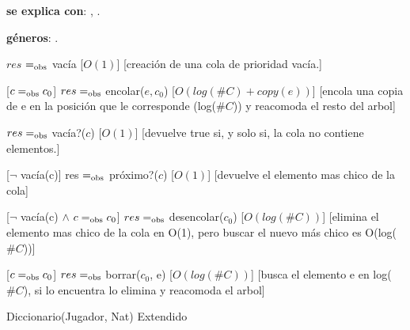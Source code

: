 \begin{Interfaz}

	\textbf{se explica con}: , .

	\textbf{géneros}: .


	{$res$ $=_{\mathrm{obs}}$ vacía}
	[$O(1)$]
	[creación de una cola de prioridad vacía.]

	[$c =_{\mathrm{obs}} c_0$]
	{$res =_{\mathrm{obs}}$ encolar($e, c_0$)}
	[$O(log(\#C) + copy(e))$]
	[encola una copia de e en la posición que le corresponde (log($\#C$)) y reacomoda el resto del arbol]

	{$res =_{\mathrm{obs}}$ vacía?($c$)}
	[$O(1)$]
	[devuelve true si, y solo si, la cola no contiene elementos.]

	[$\neg$ vacía(c)]
	{res $=_{\mathrm{obs}}$ próximo?($c$)}
	[$O(1)$]
	[devuelve el elemento mas chico de la cola]

	[$\neg$ vacía(c) $\land$ $c =_{\mathrm{obs}} c_0$]
	{$res =_{\mathrm{obs}}$ desencolar($c_0$)}
	[$O(log(\#C))$]
	[elimina el elemento mas chico de la cola en O(1), pero buscar el nuevo más chico es O(log($\#C$))]

	[$c =_{\mathrm{obs}} c_0$]
	{$res =_{\mathrm{obs}}$ borrar($c_0$, e)}
	[$O(log(\#C))$]
	[busca el elemento e en log($\#C$), si lo encuentra lo elimina y reacomoda el arbol]


  \begin{tad}{Diccionario(Jugador, Nat) Extendido}
    \parskip=0pt
    
    \tadAxiomas
  \end{tad}
\end{Interfaz}

